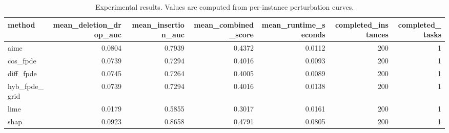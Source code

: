 \begin{table}[t]
\caption{Experimental results. Values are computed from per-instance perturbation curves.}
\label{tab:main_results_computed}
\centering
\begin{tabular}{lrrrrrr}
\toprule
method & mean\_deletion\_drop\_auc & mean\_insertion\_auc & mean\_combined\_score & mean\_runtime\_seconds & completed\_instances & completed\_tasks \\
\midrule
aime & 0.0804 & 0.7939 & 0.4372 & 0.0112 & 200 & 1 \\
cos\_fpde & 0.0739 & 0.7294 & 0.4016 & 0.0093 & 200 & 1 \\
diff\_fpde & 0.0745 & 0.7264 & 0.4005 & 0.0089 & 200 & 1 \\
hyb\_fpde\_grid & 0.0739 & 0.7294 & 0.4016 & 0.0138 & 200 & 1 \\
lime & 0.0179 & 0.5855 & 0.3017 & 0.0161 & 200 & 1 \\
shap & 0.0923 & 0.8658 & 0.4791 & 0.0805 & 200 & 1 \\
\bottomrule
\end{tabular}

\end{table}
